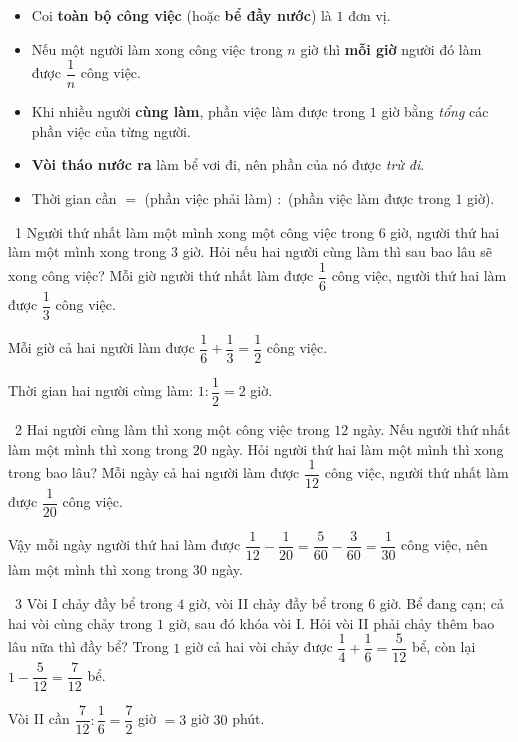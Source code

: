 \begin{knowbox}
\begin{itemize}[leftmargin=1.4em,itemsep=3pt]
\item Coi \textbf{toàn bộ công việc} (hoặc \textbf{bể đầy nước}) là $1$ đơn vị.
\item Nếu một người làm xong công việc trong $n$ giờ thì \textbf{mỗi giờ} người đó làm được $\dfrac1n$ công việc.
\item Khi nhiều người \textbf{cùng làm}, phần việc làm được trong $1$ giờ bằng \emph{tổng} các phần việc của từng người.
\item \textbf{Vòi tháo nước ra} làm bể vơi đi, nên phần của nó được \emph{trừ đi}.
\item Thời gian cần $=$ (phần việc phải làm) $:$ (phần việc làm được trong $1$ giờ).
\end{itemize}
\end{knowbox}
\gap
\begin{exbox}{\ExWord\ 1}
Người thứ nhất làm một mình xong một công việc trong $6$ giờ, người thứ hai làm một mình xong trong $3$ giờ. Hỏi nếu hai người cùng làm thì sau bao lâu sẽ xong công việc?
\guide
Mỗi giờ người thứ nhất làm được $\dfrac16$ công việc, người thứ hai làm được $\dfrac13$ công việc.\par
Mỗi giờ cả hai người làm được $\dfrac16+\dfrac13=\dfrac12$ công việc.\par
Thời gian hai người cùng làm: $1:\dfrac12=2$ giờ.
\end{exbox}
\gap
\begin{exbox}{\ExWord\ 2}
Hai người cùng làm thì xong một công việc trong $12$ ngày. Nếu người thứ nhất làm một mình thì xong trong $20$ ngày. Hỏi người thứ hai làm một mình thì xong trong bao lâu?
\guide
Mỗi ngày cả hai người làm được $\dfrac1{12}$ công việc, người thứ nhất làm được $\dfrac1{20}$ công việc.\par
Vậy mỗi ngày người thứ hai làm được $\dfrac1{12}-\dfrac1{20}=\dfrac5{60}-\dfrac3{60}=\dfrac1{30}$ công việc, nên làm một mình thì xong trong $30$ ngày.
\end{exbox}
\gap
\begin{exbox}{\ExWord\ 3}
Vòi I chảy đầy bể trong $4$ giờ, vòi II chảy đầy bể trong $6$ giờ. Bể đang cạn; cả hai vòi cùng chảy trong $1$ giờ, sau đó khóa vòi I. Hỏi vòi II phải chảy thêm bao lâu nữa thì đầy bể?
\guide
Trong $1$ giờ cả hai vòi chảy được $\dfrac14+\dfrac16=\dfrac5{12}$ bể, còn lại $1-\dfrac5{12}=\dfrac7{12}$ bể.\par
Vòi II cần $\dfrac7{12}:\dfrac16=\dfrac72$ giờ $=3$ giờ $30$ phút.
\end{exbox}
